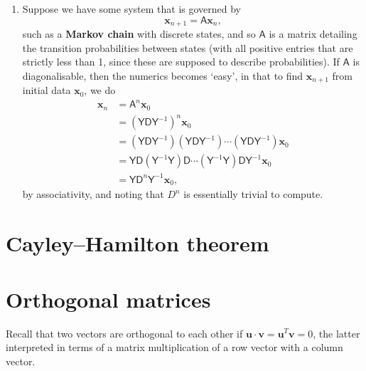 \documentclass[letter-paper]{tufte-book}
\newenvironment{example}[1][Example]{\begin{trivlist}
\item[\hskip \labelsep {\bfseries #1}]}{\end{trivlist}}
\newcommand{\As}{{\mathsf{A}}}
\newcommand{\Ds}{{\mathsf{D}}}
\newcommand{\Ys}{{\mathsf{Y}}}
\newcommand{\ub}{{\boldsymbol{u}}}
\newcommand{\vb}{{\boldsymbol{v}}}
\newcommand{\xb}{{\boldsymbol{x}}}
\begin{document}
\begin{example}
\begin{enumerate}
    \item Suppose we have some system that is governed by
    \begin{equation*}
      \xb_{n+1} = \As\xb_n,
    \end{equation*}
    such as a \textbf{Markov chain} with discrete states, and so $\As$ is
    a matrix detailing the transition probabilities between states (with all
    positive entries that are strictly less than 1, since these are supposed to
    describe probabilities). If $\As$ is diagonalisable, then the
    numerics becomes `easy', in that to find $\xb_{n+1}$ from initial
    data $\xb_0$, we do
    \begin{align*}
      \xb_n &= \As^n\xb_0 \\ 
        &= (\Ys \Ds \Ys^{-1})^n \xb_0 \\
        &= (\Ys \Ds \Ys^{-1})(\Ys \Ds \Ys^{-1})\cdots(\Ys \Ds \Ys^{-1}) \xb_0 \\
        &= \Ys \Ds (\Ys^{-1}\Ys)\Ds\cdots(\Ys^{-1}\Ys)\Ds\Ys^{-1} \xb_0 \\
        &= \Ys \Ds^n \Ys^{-1} \xb_0,
    \end{align*}
    by associativity, and noting that $D^n$ is essentially trivial to
    compute.
  \end{enumerate}
\end{example}


\section{Cayley--Hamilton theorem}


\section{Orthogonal matrices}

Recall that two vectors are orthogonal to each other if $\ub\cdot\vb = \ub^T\vb
= 0$, the latter interpreted in terms of a matrix multiplication of a row vector
with a column vector. 
\end{document}
